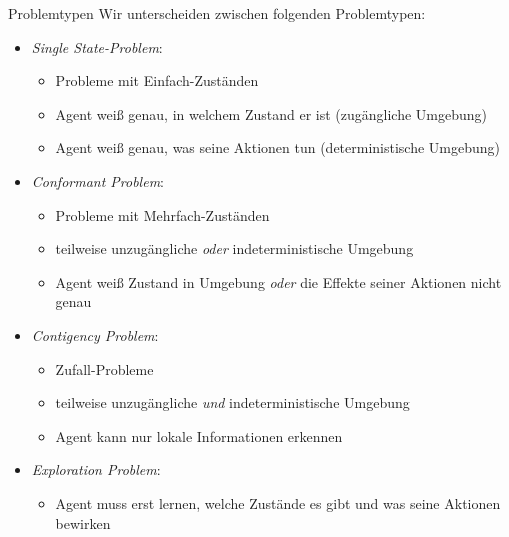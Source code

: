 \begin{defi}{Problemtypen}
    Wir unterscheiden zwischen folgenden Problemtypen:
    \begin{itemize}
        \item \emph{Single State-Problem}:
              \begin{itemize}
                  \item Probleme mit Einfach-Zuständen
                  \item Agent weiß genau, in welchem Zustand er ist (zugängliche Umgebung)
                  \item Agent weiß genau, was seine Aktionen tun (deterministische Umgebung)
              \end{itemize}
        \item \emph{Conformant Problem}:
              \begin{itemize}
                  \item Probleme mit Mehrfach-Zuständen
                  \item teilweise unzugängliche \emph{oder} indeterministische Umgebung
                  \item Agent weiß Zustand in Umgebung \emph{oder} die Effekte seiner Aktionen nicht genau
              \end{itemize}
        \item \emph{Contigency Problem}:
              \begin{itemize}
                  \item Zufall-Probleme
                  \item teilweise unzugängliche \emph{und} indeterministische Umgebung
                  \item Agent kann nur lokale Informationen erkennen
              \end{itemize}
        \item \emph{Exploration Problem}:
              \begin{itemize}
                  \item Agent muss erst lernen, welche Zustände es gibt und was seine Aktionen bewirken
              \end{itemize}
    \end{itemize}
\end{defi}


